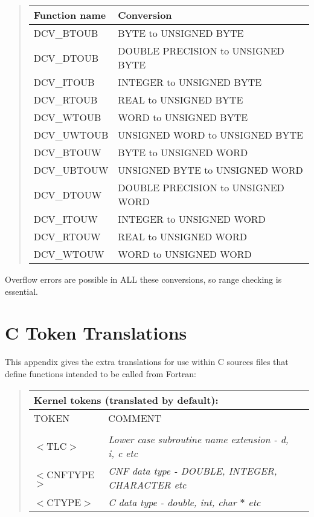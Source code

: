 \documentclass[twoside,11pt,nolof]{starlink}
\begin{document}
\begin{quote}
\begin{tabular}{ll}
\textbf{Function name}     &\textbf{Conversion}\\
\hline
DCV\_BTOUB  &BYTE to UNSIGNED BYTE \\
DCV\_DTOUB  &DOUBLE PRECISION to UNSIGNED BYTE \\
DCV\_ITOUB  &INTEGER to UNSIGNED BYTE \\
DCV\_RTOUB  &REAL to UNSIGNED BYTE \\
DCV\_WTOUB  &WORD to UNSIGNED BYTE \\
DCV\_UWTOUB &UNSIGNED WORD to UNSIGNED BYTE \\
DCV\_BTOUW  &BYTE to UNSIGNED WORD \\
DCV\_UBTOUW &UNSIGNED BYTE to UNSIGNED WORD \\
DCV\_DTOUW  &DOUBLE PRECISION to UNSIGNED WORD \\
DCV\_ITOUW  &INTEGER to UNSIGNED WORD \\
DCV\_RTOUW  &REAL to UNSIGNED WORD \\
DCV\_WTOUW  &WORD to UNSIGNED WORD \\
\end{tabular}
\end{quote}

Overflow errors are possible in ALL these conversions, so range checking is
essential.

\appendix
\newpage
\section{C Token Translations\label{ap_c}}

This appendix gives the extra translations for use within C sources files
that define functions intended to be called from Fortran:

\begin{quote}
\begin{tabular}{lll}
\multicolumn{3}{l}{\bf{Kernel} tokens (translated by default):}\\
\hline
TOKEN          &COMMENT\\
\\
$<$TLC$>$      &\emph{Lower case subroutine name extension - d, i, c etc}\\
$<$CNFTYPE$>$  &\emph{CNF data type - DOUBLE, INTEGER, CHARACTER etc}\\
$<$CTYPE$>$    &\emph{C data type - double, int, char $*$ etc}\\
\end{tabular}

\end{quote}
\end{document}
